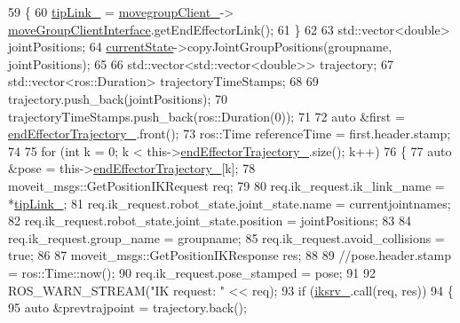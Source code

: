 \begin{DoxyCode}
59         \{
60             \hyperlink{classcl__move__group__interface_1_1CbMoveEndEffectorTrajectory_a24c6c30b9b0761a61fa002d947bd3e11}{tipLink\_} = \hyperlink{classcl__move__group__interface_1_1CbMoveEndEffectorTrajectory_aea650d3e7836125b32be97392b71a7f3}{movegroupClient\_}->
      \hyperlink{classcl__move__group__interface_1_1ClMoveGroup_a92922ea689e4e1b7b91512c56629c95b}{moveGroupClientInterface}.getEndEffectorLink();
61         \}
62 
63         std::vector<double> jointPositions;
64         \hyperlink{classsmacc_1_1ISmaccClientBehavior_a5a6658a2deb72b700ae595e594617616}{currentState}->copyJointGroupPositions(groupname, jointPositions);
65 
66         std::vector<std::vector<double>> trajectory;
67         std::vector<ros::Duration> trajectoryTimeStamps;
68 
69         trajectory.push\_back(jointPositions);
70         trajectoryTimeStamps.push\_back(ros::Duration(0));
71 
72         \textcolor{keyword}{auto} &first = \hyperlink{classcl__move__group__interface_1_1CbMoveEndEffectorTrajectory_ae13dfd31ea3660646e03882f0c2c29f0}{endEffectorTrajectory\_}.front();
73         ros::Time referenceTime = first.header.stamp;
74 
75         \textcolor{keywordflow}{for} (\textcolor{keywordtype}{int} k = 0; k < this->\hyperlink{classcl__move__group__interface_1_1CbMoveEndEffectorTrajectory_ae13dfd31ea3660646e03882f0c2c29f0}{endEffectorTrajectory\_}.size(); k++)
76         \{
77             \textcolor{keyword}{auto} &pose = this->\hyperlink{classcl__move__group__interface_1_1CbMoveEndEffectorTrajectory_ae13dfd31ea3660646e03882f0c2c29f0}{endEffectorTrajectory\_}[k];
78             moveit\_msgs::GetPositionIKRequest req;
79 
80             req.ik\_request.ik\_link\_name = *\hyperlink{classcl__move__group__interface_1_1CbMoveEndEffectorTrajectory_a24c6c30b9b0761a61fa002d947bd3e11}{tipLink\_};
81             req.ik\_request.robot\_state.joint\_state.name = currentjointnames;
82             req.ik\_request.robot\_state.joint\_state.position = jointPositions;
83 
84             req.ik\_request.group\_name = groupname;
85             req.ik\_request.avoid\_collisions = \textcolor{keyword}{true};
86 
87             moveit\_msgs::GetPositionIKResponse res;
88 
89             \textcolor{comment}{//pose.header.stamp = ros::Time::now();}
90             req.ik\_request.pose\_stamped = pose;
91 
92             ROS\_WARN\_STREAM(\textcolor{stringliteral}{"IK request: "} << req);
93             \textcolor{keywordflow}{if} (\hyperlink{classcl__move__group__interface_1_1CbMoveEndEffectorTrajectory_a8a2e2225a5b53325241e45e4e28fa3a7}{iksrv\_}.call(req, res))
94             \{
95                 \textcolor{keyword}{auto} &prevtrajpoint = trajectory.back();

\end{DoxyCode}
